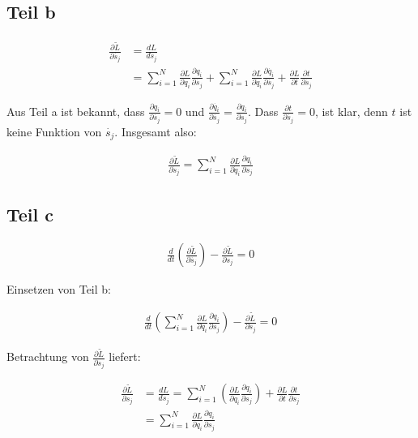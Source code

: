 \documentclass[a4paper,german,12pt,smallheadings]{scrartcl}
\begin{document}
\subsection*{Teil b}

\begin{align*}
  \frac{\partial \tilde{L}}{\partial \dot{s_j}} &= \frac{dL}{d\dot{s}_j} \\
                                                &= \sum_{i=1}^N \frac{\partial L}{\partial q_i}       \frac{\partial q_i}{\partial \dot{s_j}} +
                                                   \sum_{i=1}^N \frac{\partial L}{\partial \dot{q}_i} \frac{\partial \dot{q_i}}{\partial \dot{s_j}} +
                                                   \frac{\partial L}{\partial t} \frac{\partial t}{\partial \dot{s_j}}
\end{align*}

Aus Teil a ist bekannt, dass $\frac{\partial q_i}{\partial \dot{s_j}} = 0$ und
$\frac{\partial \dot{q_i}}{\partial \dot{s_j}} = \frac{\partial q_i}{\partial
s_j}$. Dass $\frac{\partial t}{\partial \dot{s_j}} = 0$, ist klar, denn $t$ ist
keine Funktion von $\dot{s_j}$. Insgesamt also:


\begin{align*}
  \frac{\partial \tilde{L}}{\partial \dot{s}_j} = \sum_{i=1}^N \frac{\partial L}{\partial \dot{q}_i} \frac{\partial q_i}{\partial s_j}
\end{align*}

\subsection*{Teil c}

\begin{align*}
  \frac{d}{dt} \left(\frac{\partial \tilde{L}}{\partial \dot{s_j}}\right) - \frac{\partial \tilde{L}}{\partial s_j} = 0
\end{align*}

Einsetzen von Teil b:

\begin{align*}
\frac{d}{dt} \left(
  \sum_{i=1}^N \frac{\partial L}{\partial \dot{q}_i} \frac{\partial q_i}{\partial s_j}
\right) - \frac{\partial \tilde{L}}{\partial s_j} = 0
\end{align*}

Betrachtung von $\frac{\partial \tilde{L}}{\partial s_j}$ liefert:

\begin{align*}
  \frac{\partial \tilde{L}}{\partial s_j} &= \frac{dL}{ds_j} = \sum_{i=1}^N \left(\frac{\partial L}{\partial q_i} \frac{\partial q_i}{\partial s_j}\right) + \frac{\partial L}{\partial t}\frac{\partial t}{\partial s_j} \\
  &= \sum_{i=1}^N \frac{\partial L}{\partial q_i} \frac{\partial q_i}{\partial s_j}
\end{align*}
\end{document}
